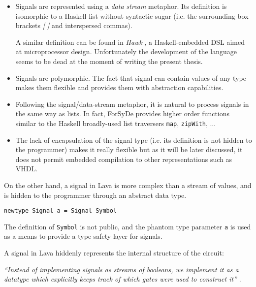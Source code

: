 \begin{itemize}

\item Signals are represented using a \textit{data stream} metaphor.
  Its definition is isomorphic to a Haskell list without syntactic
  sugar (i.e. the surrounding box brackets \textit{[ ]} and
  interspersed commas).

  A similar definition can be found in \textit{Hawk} \cite{hawk}, a
  Haskell-embedded DSL aimed at microprocessor design. Unfortunately
  the development of the language seems to be dead at the moment of
  writing the present thesis.

\item Signals are polymorphic. The fact that signal can contain values
  of any type makes them flexible and provides them with abstraction
  capabilities.
 
\item Following the signal/data-stream metaphor, it is natural to
  process signals in the same way as lists. In fact, ForSyDe provides
  higher order functions similar to the Haskell broadly-used list traversers
  \texttt{map}, \texttt{zipWith}, $\dots$

\item The lack of encapsulation of the signal type (i.e. its
  definition is not hidden to the programmer) makes it really flexible
  but as it will be later discussed, it does not permit embedded compilation
  to other representations such as VHDL.
\end{itemize}


On the other hand, a signal in Lava is more complex than a stream of
values, and is hidden to the programmer through an abstract data type.

\begin{lstlisting}
newtype Signal a = Signal Symbol 
\end{lstlisting}



The definition of \texttt{Symbol} is not public, and the phantom type
parameter \texttt{a} is used as a means to provide a type safety layer
for signals.


A signal in Lava hiddenly represents the internal structure of the circuit:


\textit{``Instead of implementing signals as streams of booleans, we
  implement it as a datatype which explicitly keeps track of which
  gates were used to construct it''} \cite[section 1.6]{lava:thesis}.

